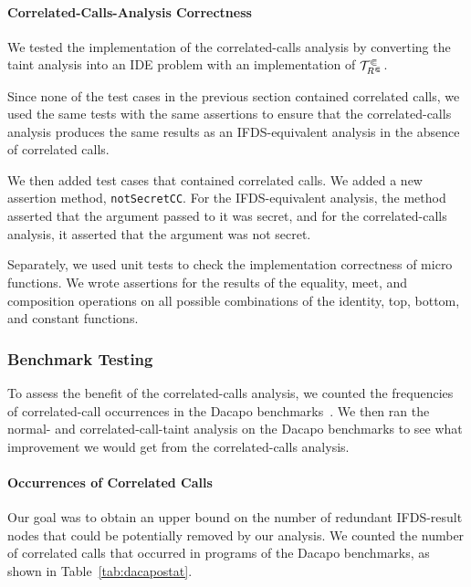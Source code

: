 \paragraph{Correlated-Calls-Analysis Correctness}
We tested the implementation of the correlated-calls analysis by converting the taint analysis into an IDE problem with an implementation of $\mathcal T^\Subset_{R^\Subset}$.

Since none of the test cases in the previous section contained correlated calls, we used the same tests with the same assertions to ensure that the correlated-calls analysis produces the same results as an IFDS-equivalent analysis in the absence of correlated calls.

We then added test cases that contained correlated calls. We added a new assertion method, \verb'notSecretCC'. For the IFDS-equivalent analysis, the method asserted that the argument passed to it was secret, and for the correlated-calls analysis, it asserted that the argument was not secret.

Separately, we used unit tests to check the implementation correctness of micro functions. We wrote assertions for the results of the equality, meet, and composition operations on all possible combinations of the identity, top, bottom, and constant functions.

\subsubsection{Benchmark Testing}
To assess the benefit of the correlated-calls analysis, we counted the frequencies of correlated-call occurrences in the Dacapo benchmarks~\cite{blackburn2006dacapo}. We then ran the normal- and correlated-call-taint analysis on the Dacapo benchmarks to see what improvement we would get from the correlated-calls analysis.

\paragraph{Occurrences of Correlated Calls}
Our goal was to obtain an upper bound on the number of redundant IFDS-result nodes that could be potentially removed by our analysis.
We counted the number of correlated calls that occurred in programs of the Dacapo benchmarks, as shown in Table~\ref{tab:dacapostat}.

